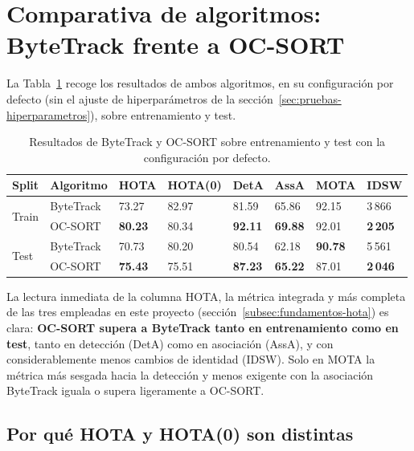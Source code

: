 \section{Comparativa de algoritmos: ByteTrack frente a OC-SORT}
\label{sec:pruebas-comparativa}

La Tabla~\ref{tab:pruebas-comparativa} recoge los resultados de ambos
algoritmos, en su configuración por defecto (sin el ajuste de
hiperparámetros de la sección~\ref{sec:pruebas-hiperparametros}), sobre
entrenamiento y test.

\begin{table}[htp]
\centering
\caption{Resultados de ByteTrack y OC-SORT sobre entrenamiento y test con la configuración por defecto.}
\label{tab:pruebas-comparativa}
\renewcommand{\arraystretch}{1.25}
\begin{tabular}{|p{1.7cm}|p{2.1cm}|p{1.3cm}|p{1.8cm}|p{1.3cm}|p{1.3cm}|p{1.3cm}|p{1.3cm}|}
\hline
\rowcolor{gray!25}
\textbf{Split} & \textbf{Algoritmo} & \textbf{HOTA} & \textbf{HOTA(0)} & \textbf{DetA} & \textbf{AssA} & \textbf{MOTA} & \textbf{IDSW} \\
\hline
\multirow{2}{*}{Train} & ByteTrack & 73.27 & 82.97 & 81.59 & 65.86 & 92.15 & 3\,866 \\
\cline{2-8}
 & OC-SORT & \textbf{80.23} & 80.34 & \textbf{92.11} & \textbf{69.88} & 92.01 & \textbf{2\,205} \\
\hline
\multirow{2}{*}{Test} & ByteTrack & 70.73 & 80.20 & 80.54 & 62.18 & \textbf{90.78} & 5\,561 \\
\cline{2-8}
 & OC-SORT & \textbf{75.43} & 75.51 & \textbf{87.23} & \textbf{65.22} & 87.01 & \textbf{2\,046} \\
\hline
\end{tabular}
\end{table}

La lectura inmediata de la columna HOTA, la métrica integrada y más
completa de las tres empleadas en este proyecto
(sección~\ref{subsec:fundamentos-hota}) es clara: \textbf{OC-SORT supera
a ByteTrack tanto en entrenamiento como en test}, tanto en detección
(DetA) como en asociación (AssA), y con considerablemente menos cambios de
identidad (IDSW). Solo en MOTA la métrica más sesgada hacia la
detección y menos exigente con la asociación ByteTrack iguala o supera
ligeramente a OC-SORT.

\subsection{Por qué HOTA y HOTA(0) son distintas}
\label{subsec:pruebas-hota-explicacion}

